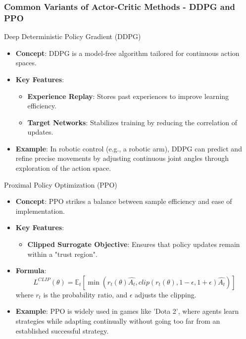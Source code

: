 \documentclass{beamer}
\begin{document}
\begin{frame}[fragile]
    \frametitle{Common Variants of Actor-Critic Methods - DDPG and PPO}
    \begin{block}{Deep Deterministic Policy Gradient (DDPG)}
        \begin{itemize}
            \item \textbf{Concept}: DDPG is a model-free algorithm tailored for continuous action spaces.
            \item \textbf{Key Features}:
            \begin{itemize}
                \item \textbf{Experience Replay}: Stores past experiences to improve learning efficiency.
                \item \textbf{Target Networks}: Stabilizes training by reducing the correlation of updates.
            \end{itemize}
            \item \textbf{Example}: In robotic control (e.g., a robotic arm), DDPG can predict and refine precise movements by adjusting continuous joint angles through exploration of the action space.
        \end{itemize}
    \end{block}
    
    \begin{block}{Proximal Policy Optimization (PPO)}
        \begin{itemize}
            \item \textbf{Concept}: PPO strikes a balance between sample efficiency and ease of implementation.
            \item \textbf{Key Features}:
            \begin{itemize}
                \item \textbf{Clipped Surrogate Objective}: Ensures that policy updates remain within a "trust region".
            \end{itemize}
            \item \textbf{Formula}:
            \begin{equation}
                L^{CLIP}(\theta) = \mathbb{E}_t\left[\min\left(r_t(\theta)\hat{A_t}, clip\left(r_t(\theta), 1 - \epsilon, 1 + \epsilon\right)\hat{A_t}\right)\right]
            \end{equation}
            where \(r_t\) is the probability ratio, and \(\epsilon\) adjusts the clipping.
            \item \textbf{Example}: PPO is widely used in games like 'Dota 2', where agents learn strategies while adapting continually without going too far from an established successful strategy.
        \end{itemize}
    \end{block}
\end{frame}
\end{document}
